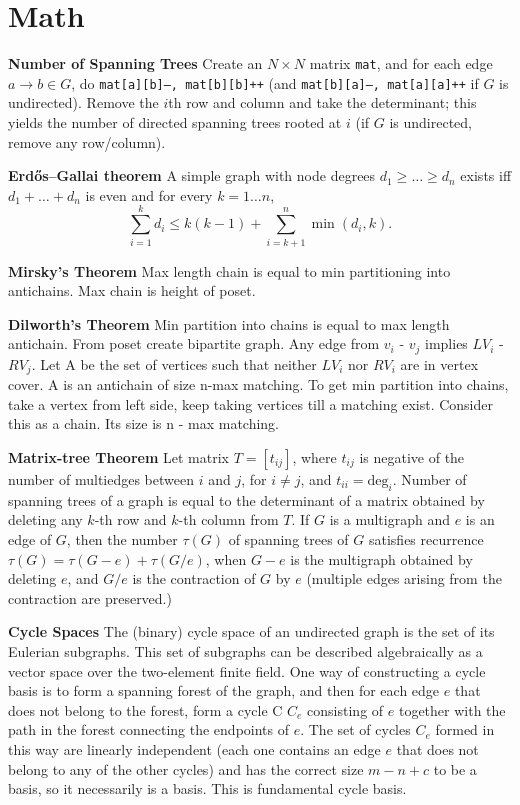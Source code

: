\section{Math}
\textbf{Number of Spanning Trees}
Create an $N\times N$ matrix \texttt{mat}, and for each edge $a \rightarrow b \in G$, do
\texttt{mat[a][b]--, mat[b][b]++} (and \texttt{mat[b][a]--, mat[a][a]++} if $G$ is undirected).
Remove the $i$th row and column and take the determinant; this yields the number of directed spanning trees rooted at $i$
(if $G$ is undirected, remove any row/column).

\textbf{Erdős–Gallai theorem}
A simple graph with node degrees $d_1 \ge \dots \ge d_n$ exists iff $d_1 + \dots + d_n$ is even and for every $k = 1\dots n$,
\[ \sum _{i=1}^{k}d_{i}\leq k(k-1)+\sum _{i=k+1}^{n}\min(d_{i},k). \]

\textbf{Mirsky's Theorem} Max length chain is equal to min partitioning into antichains. Max chain is height of poset.

\textbf{Dilworth's Theorem} Min partition into chains is equal to max length antichain. From poset create bipartite graph. Any edge from $v_{i}$ - $v_{j}$ implies  $LV_{i}$ - $RV_{j}$. Let A be the set of vertices such that neither $LV_{i}$ nor $RV_{i}$ are in vertex cover. A is an antichain of size n-max matching. To get min partition into chains, take a vertex from left side, keep taking vertices till a matching exist. Consider this as a chain. Its size is n - max matching.

\textbf{Matrix-tree Theorem} Let matrix $T = [t_{ij}]$, where $t_{ij}$ is negative of the number of multiedges between $i$ and $j$, for $i \ne j$, and $t_{ii} = \mbox{deg}_i$. Number of spanning trees of a graph is equal to the determinant of a matrix obtained by deleting any $k$-th row and $k$-th column from $T$. If $G$ is a multigraph and $e$ is an edge of $G$, then the number $\tau(G)$ of spanning trees of $G$ satisfies recurrence $\tau(G) = \tau(G-e) + \tau(G/e)$, when $G-e$ is the multigraph obtained by deleting $e$, and $G/e$ is the contraction of $G$ by $e$ (multiple edges arising from the contraction are preserved.)

\textbf{Cycle Spaces} The (binary) cycle space of an undirected graph is the set of its Eulerian subgraphs. This set of subgraphs can be described algebraically as a vector space over the two-element finite field. One way of constructing a cycle basis is to form a spanning forest of the graph, and then for each edge $e$ that does not belong to the forest, form a cycle C  $C_{e}$ consisting of $e$ together with the path in the forest connecting the endpoints of $e$. The set of cycles $C_{e}$ formed in this way are linearly independent (each one contains an edge $e$ that does not belong to any of the other cycles) and has the correct size $m - n + c$ to be a basis, so it necessarily is a basis. This is fundamental cycle basis.

